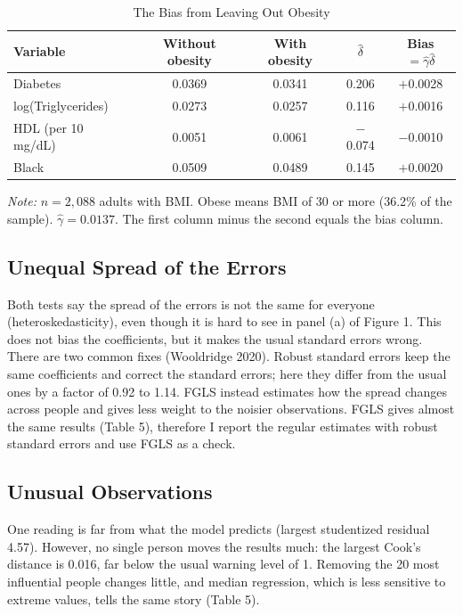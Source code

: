 \documentclass[preprint,letterpaper,11pt,authoryear]{elsarticle}
\newenvironment{tablenotes}{\par\vspace{3pt}\begin{minipage}{0.95\linewidth}\footnotesize\textit{Note:} }{\end{minipage}}
\begin{document}
\begin{table}[!htbp]
\centering\small\setlength{\tabcolsep}{4pt}
\caption{The Bias from Leaving Out Obesity}
\begin{tabular}{lcccc}
\toprule
Variable & Without obesity & With obesity & $\hat\delta$ & Bias $= \hat\gamma\hat\delta$ \\
\midrule
Diabetes & 0.0369 & 0.0341 & 0.206 & $+$0.0028 \\
log(Triglycerides) & 0.0273 & 0.0257 & 0.116 & $+$0.0016 \\
HDL (per 10 mg/dL) & 0.0051 & 0.0061 & $-$0.074 & $-$0.0010 \\
Black & 0.0509 & 0.0489 & 0.145 & $+$0.0020 \\
\bottomrule
\end{tabular}
\begin{tablenotes}
$n = 2{,}088$ adults with BMI. Obese means BMI of 30 or more (36.2\% of the sample). $\hat\gamma = 0.0137$. The first column minus the second equals the bias column.
\end{tablenotes}
\end{table}

\subsection{Unequal Spread of the Errors}
Both tests say the spread of the errors is not the same for everyone (heteroskedasticity), even though it is hard to see in panel (a) of Figure 1. This does not bias the coefficients, but it makes the usual standard errors wrong. There are two common fixes (Wooldridge 2020). Robust standard errors keep the same coefficients and correct the standard errors; here they differ from the usual ones by a factor of 0.92 to 1.14. FGLS instead estimates how the spread changes across people and gives less weight to the noisier observations. FGLS gives almost the same results (Table 5), therefore I report the regular estimates with robust standard errors and use FGLS as a check.

\subsection{Unusual Observations}
One reading is far from what the model predicts (largest studentized residual 4.57). However, no single person moves the results much: the largest Cook's distance is 0.016, far below the usual warning level of 1. Removing the 20 most influential people changes little, and median regression, which is less sensitive to extreme values, tells the same story (Table 5).
\end{document}
